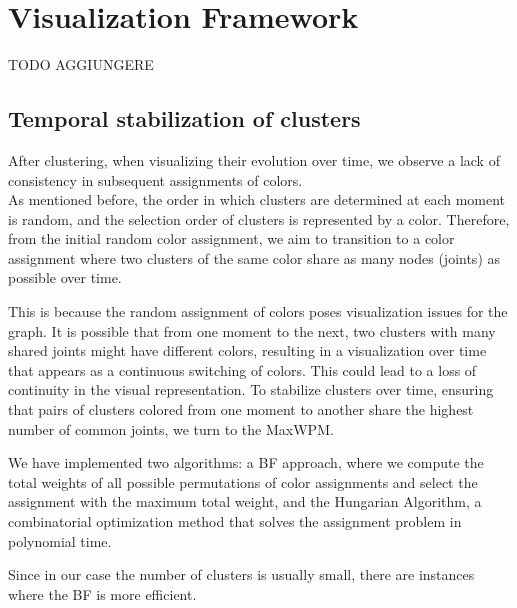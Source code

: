 \section{Visualization Framework}
TODO AGGIUNGERE

\subsection{Temporal stabilization of clusters}

After clustering, when visualizing their evolution over time, we observe a lack of consistency in subsequent assignments of colors. \\
As mentioned before, the order in which clusters are determined at each moment is random, and the selection order of clusters is represented by a color.
Therefore, from the initial random color assignment, we aim to transition to a color assignment where two clusters of the same color share as many nodes (joints) as possible over time.

This is because the random assignment of colors poses visualization issues for the graph.
It is possible that from one moment to the next, two clusters with many shared joints might have different colors, resulting in a visualization over time that appears as a continuous switching of colors. This could lead to a loss of continuity in the visual representation.
To stabilize clusters over time, ensuring that pairs of clusters colored from one moment to another share the highest number of common joints, we turn to the MaxWPM.

We have implemented two algorithms: a BF approach, where we compute the total weights of all possible permutations of color assignments and select the assignment with the maximum total weight, and the Hungarian Algorithm, a combinatorial optimization method that solves the assignment problem in polynomial time.

Since in our case the number of clusters is usually small, there are instances where the BF is more efficient.

